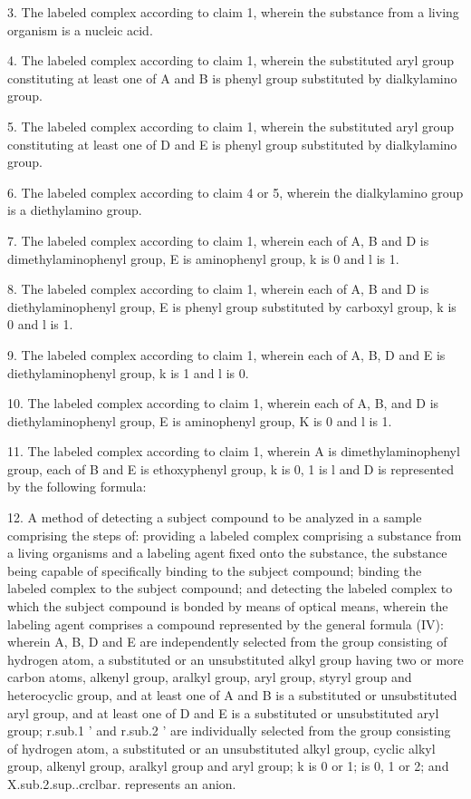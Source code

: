 \documentclass[11pt,a4paper]{article}
\begin{document}
3. The labeled complex according to claim 1, wherein the substance from a living organism is a nucleic acid.

4. The labeled complex according to claim 1, wherein the substituted aryl group constituting at least one of A and B is phenyl group substituted by dialkylamino group.

5. The labeled complex according to claim 1, wherein the substituted aryl group constituting at least one of D and E is phenyl group substituted by dialkylamino group.

6. The labeled complex according to claim 4 or 5, wherein the dialkylamino group is a diethylamino group.

7. The labeled complex according to claim 1, wherein each of A, B and D is dimethylaminophenyl group, E is aminophenyl group, k is 0 and l is 1.

8. The labeled complex according to claim 1, wherein each of A, B and D is diethylaminophenyl group, E is phenyl group substituted by carboxyl group, k is 0 and l is 1.

9. The labeled complex according to claim 1, wherein each of A, B, D and E is diethylaminophenyl group, k is 1 and l is 0.

10. The labeled complex according to claim 1, wherein each of A, B, and D is diethylaminophenyl group, E is aminophenyl group, K is 0 and l is 1.

11. The labeled complex according to claim 1, wherein A is dimethylaminophenyl group, each of B and E is ethoxyphenyl group, k is 0, 1 is l and D is represented by the following formula:

12. A method of detecting a subject compound to be analyzed in a sample comprising the steps of: providing a labeled complex comprising a substance from a living organisms and a labeling agent fixed onto the substance, the substance being capable of specifically binding to the subject compound; binding the labeled complex to the subject compound; and detecting the labeled complex to which the subject compound is bonded by means of optical means, wherein the labeling agent comprises a compound represented by the general formula (IV): wherein A, B, D and E are independently selected from the group consisting of hydrogen atom, a substituted or an unsubstituted alkyl group having two or more carbon atoms, alkenyl group, aralkyl group, aryl group, styryl group and heterocyclic group, and at least one of A and B is a substituted or unsubstituted aryl group, and at least one of D and E is a substituted or unsubstituted aryl group; r.sub.1 ' and r.sub.2 ' are individually selected from the group consisting of hydrogen atom, a substituted or an unsubstituted alkyl group, cyclic alkyl group, alkenyl group, aralkyl group and aryl group; k is 0 or 1; is 0, 1 or 2; and X.sub.2.sup..crclbar.  represents an anion.
\end{document}
